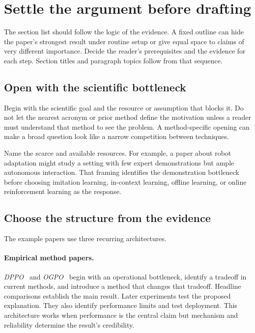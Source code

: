 \section{Settle the argument before drafting}
\label{sec:architecture}

The section list should follow the logic of the evidence. A fixed outline can
hide the paper's strongest result under routine setup or give equal space to
claims of very different importance. Decide the reader's prerequisites and the
evidence for each step. Section titles and paragraph topics follow from that
sequence.

\subsection{Open with the scientific bottleneck}

Begin with the scientific goal and the resource or assumption that blocks it.
Do not let the nearest acronym or prior method define the motivation unless a
reader must understand that method to see the problem. A method-specific
opening can make a broad question look like a narrow competition between
techniques.

Name the scarce and available resources. For example, a paper about robot
adaptation might study a setting with few expert
demonstrations but ample autonomous interaction. That framing identifies the
demonstration bottleneck before choosing imitation learning, in-context
learning, offline learning, or online reinforcement learning as the response.

\subsection{Choose the structure from the evidence}

The example papers use three recurring architectures.

\paragraph{Empirical method papers.}
\emph{DPPO}~\citep{ren2024diffusion} and
\emph{OGPO}~\citep{patil2026ogpo} begin with an operational bottleneck,
identify a tradeoff in current methods, and introduce a method that changes
that tradeoff. Headline comparisons establish the main result. Later
experiments test the proposed explanation. They also identify performance
limits and test deployment. This architecture works when performance is the
central claim but mechanism and reliability determine the result's
credibility.

